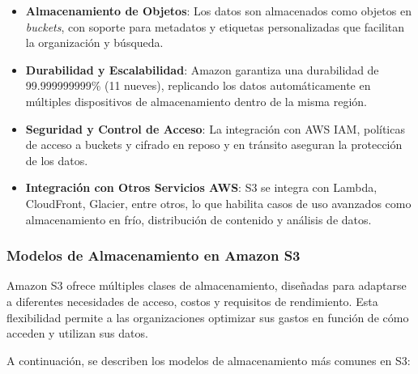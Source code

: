 {                \begin{itemize}
                    \item \textbf{Almacenamiento de Objetos}: Los datos son almacenados como objetos en \textit{buckets}, con soporte para metadatos y etiquetas personalizadas que facilitan la organización y búsqueda.
                    \item \textbf{Durabilidad y Escalabilidad}: Amazon garantiza una durabilidad de 99.999999999\% (11 nueves), replicando los datos automáticamente en múltiples dispositivos de almacenamiento dentro de la misma región.
                    \item \textbf{Seguridad y Control de Acceso}: La integración con AWS IAM, políticas de acceso a buckets y cifrado en reposo y en tránsito aseguran la protección de los datos.
                    \item \textbf{Integración con Otros Servicios AWS}: S3 se integra con Lambda, CloudFront, Glacier, entre otros, lo que habilita casos de uso avanzados como almacenamiento en frío, distribución de contenido y análisis de datos.
                \end{itemize}
                
            \subsubsection{Modelos de Almacenamiento en Amazon S3}
                Amazon S3 ofrece múltiples clases de almacenamiento, diseñadas para adaptarse a diferentes necesidades de acceso, costos y requisitos de rendimiento. Esta flexibilidad permite a las organizaciones optimizar sus gastos en función de cómo acceden y utilizan sus datos.
                
                A continuación, se describen los modelos de almacenamiento más comunes en S3:
                
}
